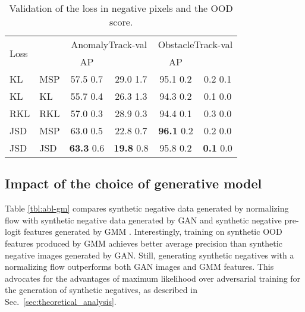 \documentclass[lettersize,journal,hidelinks]{IEEEtran}
\begin{document}
\begin{table}[ht]
\centering
\caption{Validation of the loss in negative pixels and the OOD score.
}
\label{tbl:abl-loss}
\begin{footnotesize}
\begin{tabular}{ll|cccc}
\hline \hline
 \multirow{2}{*}{Loss}& \multirow{2}{*}{} & \multicolumn{2}{c|}{AnomalyTrack-val} & \multicolumn{2}{c}{ObstacleTrack-val} \\
 &  & AP & \multicolumn{1}{c|}{} & AP & \multicolumn{1}{c}{}\\ \hline \hline
 KL & MSP & 57.5  0.7& 29.0  1.7& 95.1  0.2& 0.2  0.1\\
 KL & KL & 55.7  0.4& 26.3  1.3& 94.3  0.2& 0.1  0.0\\
 RKL & RKL & 57.0  0.3& 28.9  0.3& 94.4  0.1 & 0.3  0.0\\
 JSD & MSP & 63.0  0.5& 22.8  0.7 & \textbf{96.1}   0.2 & 0.2   0.0\\
 JSD & JSD & \textbf{63.3}  0.6& \textbf{19.8}  0.8& 95.8  0.2& \textbf{0.1}  0.0\\
\hline
\end{tabular}
\end{footnotesize}
\end{table}


\subsection{Impact of the choice of generative model}

Table \ref{tbl:abl-gm} compares synthetic negative data generated by normalizing flow with synthetic negative data generated by GAN\cite{lee18iclr} and synthetic negative pre-logit features generated by GMM \cite{du22iclr}.
Interestingly, training on synthetic OOD features produced by GMM achieves better average precision than synthetic negative images generated by GAN.
Still, generating synthetic negatives with a normalizing flow outperforms both GAN images and GMM features.
This advocates for the advantages of maximum likelihood over adversarial training for the generation of synthetic negatives, as described in  Sec.\ \ref{sec:theoretical_analysis}.
\end{document}
